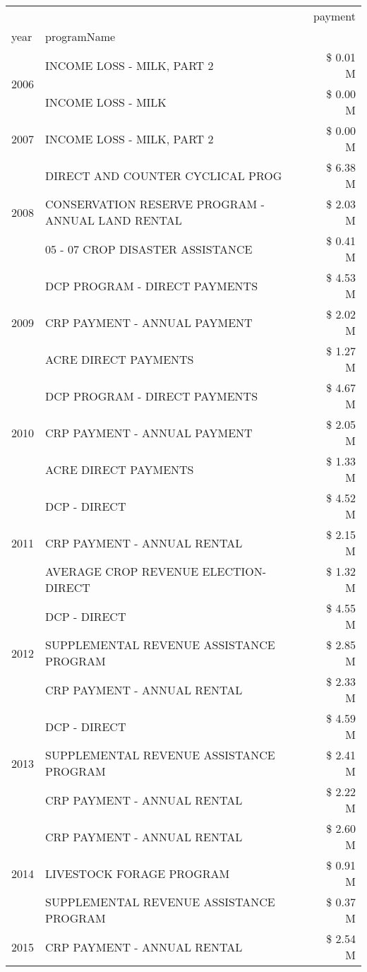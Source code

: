 \begin{tabular}{llr}
\toprule
 &  & payment \\
year & programName &  \\
\midrule
\multirow[t]{2}{*}{2006} & INCOME LOSS - MILK, PART 2 & \$ 0.01 M \\
 & INCOME LOSS - MILK & \$ 0.00 M \\
\cline{1-3}
2007 & INCOME LOSS - MILK, PART 2 & \$ 0.00 M \\
\cline{1-3}
\multirow[t]{3}{*}{2008} & DIRECT AND COUNTER CYCLICAL PROG & \$ 6.38 M \\
 & CONSERVATION RESERVE PROGRAM - ANNUAL LAND RENTAL & \$ 2.03 M \\
 & 05 - 07 CROP DISASTER ASSISTANCE & \$ 0.41 M \\
\cline{1-3}
\multirow[t]{3}{*}{2009} & DCP PROGRAM - DIRECT PAYMENTS & \$ 4.53 M \\
 & CRP PAYMENT - ANNUAL PAYMENT & \$ 2.02 M \\
 & ACRE DIRECT PAYMENTS & \$ 1.27 M \\
\cline{1-3}
\multirow[t]{3}{*}{2010} & DCP PROGRAM - DIRECT PAYMENTS & \$ 4.67 M \\
 & CRP PAYMENT - ANNUAL PAYMENT & \$ 2.05 M \\
 & ACRE DIRECT PAYMENTS & \$ 1.33 M \\
\cline{1-3}
\multirow[t]{3}{*}{2011} & DCP - DIRECT & \$ 4.52 M \\
 & CRP PAYMENT - ANNUAL RENTAL & \$ 2.15 M \\
 & AVERAGE CROP REVENUE ELECTION-DIRECT & \$ 1.32 M \\
\cline{1-3}
\multirow[t]{3}{*}{2012} & DCP - DIRECT & \$ 4.55 M \\
 & SUPPLEMENTAL REVENUE ASSISTANCE PROGRAM & \$ 2.85 M \\
 & CRP PAYMENT - ANNUAL RENTAL & \$ 2.33 M \\
\cline{1-3}
\multirow[t]{3}{*}{2013} & DCP - DIRECT & \$ 4.59 M \\
 & SUPPLEMENTAL REVENUE ASSISTANCE PROGRAM & \$ 2.41 M \\
 & CRP PAYMENT - ANNUAL RENTAL & \$ 2.22 M \\
\cline{1-3}
\multirow[t]{3}{*}{2014} & CRP PAYMENT - ANNUAL RENTAL & \$ 2.60 M \\
 & LIVESTOCK FORAGE PROGRAM & \$ 0.91 M \\
 & SUPPLEMENTAL REVENUE ASSISTANCE PROGRAM & \$ 0.37 M \\
\cline{1-3}
\multirow[t]{3}{*}{2015} & CRP PAYMENT - ANNUAL RENTAL & \$ 2.54 M \\

\end{tabular}
